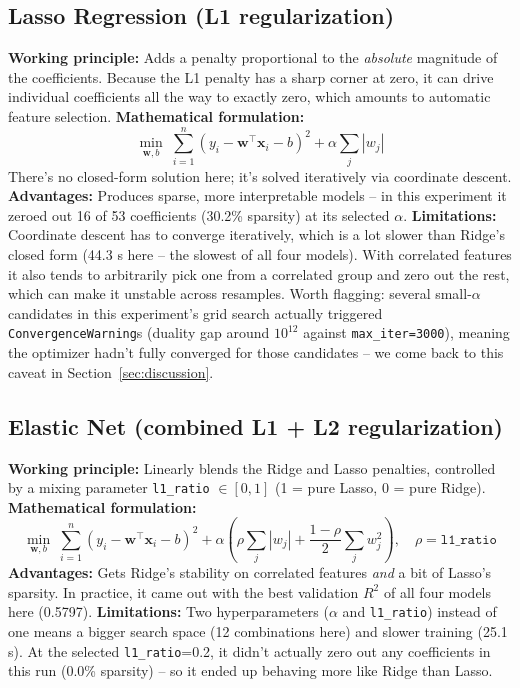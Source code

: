 \documentclass[12pt,a4paper]{article}
\begin{document}
\subsection*{Lasso Regression (L1 regularization)}
\textbf{Working principle:} Adds a penalty proportional to the \textit{absolute} magnitude of the coefficients. Because the L1 penalty has a sharp corner at zero, it can drive individual coefficients all the way to exactly zero, which amounts to automatic feature selection.
\textbf{Mathematical formulation:}
\[
\min_{\mathbf{w}, b} \; \sum_{i=1}^{n} \left(y_i - \mathbf{w}^\top \mathbf{x}_i - b\right)^2 + \alpha \sum_{j} |w_j|
\]
There's no closed-form solution here; it's solved iteratively via coordinate descent.
\textbf{Advantages:} Produces sparse, more interpretable models -- in this experiment it zeroed out 16 of 53 coefficients (30.2\% sparsity) at its selected $\alpha$.
\textbf{Limitations:} Coordinate descent has to converge iteratively, which is a lot slower than Ridge's closed form (44.3 s here -- the slowest of all four models). With correlated features it also tends to arbitrarily pick one from a correlated group and zero out the rest, which can make it unstable across resamples. Worth flagging: several small-$\alpha$ candidates in this experiment's grid search actually triggered \texttt{ConvergenceWarning}s (duality gap around $10^{12}$ against \texttt{max\_iter=3000}), meaning the optimizer hadn't fully converged for those candidates -- we come back to this caveat in Section~\ref{sec:discussion}.

\subsection*{Elastic Net (combined L1 + L2 regularization)}
\textbf{Working principle:} Linearly blends the Ridge and Lasso penalties, controlled by a mixing parameter \texttt{l1\_ratio} $\in [0,1]$ (1 = pure Lasso, 0 = pure Ridge).
\textbf{Mathematical formulation:}
\[
\min_{\mathbf{w}, b} \; \sum_{i=1}^{n} \left(y_i - \mathbf{w}^\top \mathbf{x}_i - b\right)^2 + \alpha \left(\rho \sum_j |w_j| + \frac{1-\rho}{2} \sum_j w_j^2\right), \quad \rho = \texttt{l1\_ratio}
\]
\textbf{Advantages:} Gets Ridge's stability on correlated features \textit{and} a bit of Lasso's sparsity. In practice, it came out with the best validation $R^2$ of all four models here (0.5797).
\textbf{Limitations:} Two hyperparameters ($\alpha$ and \texttt{l1\_ratio}) instead of one means a bigger search space (12 combinations here) and slower training (25.1 s). At the selected \texttt{l1\_ratio}=0.2, it didn't actually zero out any coefficients in this run (0.0\% sparsity) -- so it ended up behaving more like Ridge than Lasso.
\end{document}
